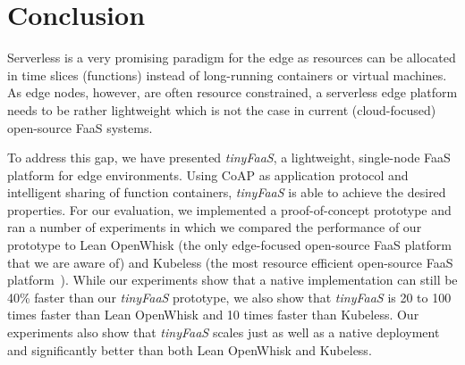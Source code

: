 \chapter{Conclusion}
\label{cha:conclusion}
Serverless is a very promising paradigm for the edge as resources can be allocated in time slices (functions) instead of long-running containers or virtual machines.
As edge nodes, however, are often resource constrained, a serverless edge platform needs to be rather lightweight which is not the case in current (cloud-focused) open-source FaaS systems.

To address this gap, we have presented \textit{tinyFaaS}, a lightweight, single-node FaaS platform for edge environments.
Using CoAP as application protocol and intelligent sharing of function containers, \textit{tinyFaaS} is able to achieve the desired properties.
For our evaluation, we implemented a proof-of-concept prototype and ran a number of experiments in which we compared the performance of our prototype to Lean OpenWhisk (the only edge-focused open-source FaaS platform that we are aware of) and Kubeless (the most resource efficient open-source FaaS platform~\cite{Palade2019-mo}).
While our experiments show that a native implementation can still be 40\% faster than our \textit{tinyFaaS} prototype, we also show that \textit{tinyFaaS} is 20 to 100 times faster than Lean OpenWhisk and 10 times faster than Kubeless.
Our experiments also show that \textit{tinyFaaS} scales just as well as a native deployment and significantly better than both Lean OpenWhisk and Kubeless.
